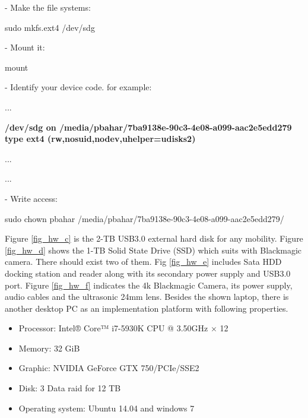 \documentclass[[12pt,DIV14,BCOR12mm,a4paper,footexclude,headinclude,halfparskip-,twoside,openright,cleardoubleempty,idxtotoc,bibtotoc]{article}
\begin{document}
- Make the file systems:

\begin{framed}
 
sudo mkfs.ext4 /dev/sdg

\end{framed}


- Mount it:

 
\begin{framed}
 
mount

\end{framed}

- Identify your device code. for example:

\begin{framed}

...

\textbf{/dev/sdg on /media/pbahar/7ba9138e-90c3-4e08-a099-aac2e5edd279 type ext4 (rw,nosuid,nodev,uhelper=udisks2)}

...

...

\end{framed}


- Write access:

\begin{framed}
 
sudo chown pbahar /media/pbahar/7ba9138e-90c3-4e08-a099-aac2e5edd279/


\end{framed}



Figure \ref{fig_hw_c} is the 2-TB USB3.0 external hard disk for any mobility.  
Figure \ref{fig_hw_d} shows the 1-TB Solid State Drive (SSD) which suits with Blackmagic camera. There should exist two of them.
Fig \ref{fig_hw_e} includes Sata HDD docking station and reader along with its secondary power supply and USB3.0 port. 
Figure \ref{fig_hw_f} indicates the 4k Blackmagic Camera, its power supply, audio cables and the ultrasonic 24mm lens. 
Besides the shown laptop, there is another desktop PC as an implementation platform with following properties.

\begin{itemize}
	\item Processor: Intel® Core™ i7-5930K CPU @ 3.50GHz × 12 
	\item Memory: 32 GiB
	\item Graphic: NVIDIA GeForce GTX 750/PCIe/SSE2
	\item Disk: 3 Data raid for 12 TB
	\item Operating system: Ubuntu 14.04 and windows 7
\end{itemize}
\end{document}

